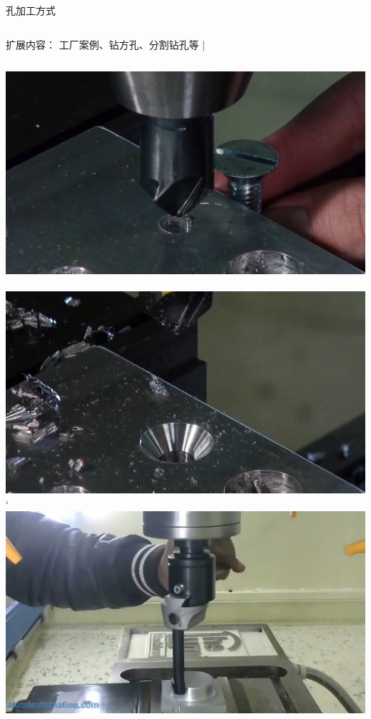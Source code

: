 \documentclass[utf8,zihao=-4,handout,smaller,aspectratio=1610]{ctexbeamer}
\begin{document}
\begin{frame}{孔加工方式}
	\begin{columns}
		\begin{block}{扩展内容：}
			工厂案例、钻方孔、分割钻孔等
			|\end{block}
	\end{columns}
	
	\vspace{25pt}
	
	\includegraphics[width=0.3\linewidth,trim=0 0 0 0,clip,angle=0]{image/zhuikong.jpg}~
	\includegraphics[width=0.3\linewidth,trim=0 0 0 0,clip,angle=0]{image/zhuimian.jpg}`
	\includegraphics[width=0.3\linewidth,trim=0 0 0 0,clip,angle=0]{image/tangwaixing.jpg}
	
\end{frame}
\end{document}
